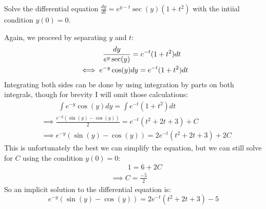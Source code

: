 \begin{example}
    Solve the differential equation $\frac{dy}{dt} = e^{y - t}\sec(y)(1 + t^2)$ with the intiial condition $y(0) = 0$. 
\end{example}
\begin{solution}
    Again, we proceed by separating $y$ and $t$:
    \begin{align*}
        &\hspace{1.2cm }\frac{dy}{e^y\sec(y)} = e^{-t}(1 + t^2)dt \\
        &\iff e^{-y}\cos(y) dy =  e^{-t}(1 + t^2)dt
    \end{align*}
    Integrating both sides can be done by using integration by parts on both integrals, though for brevity I will omit those calculations:
    \begin{align*}
        &\hspace{1cm} \int e^{-y}\cos(y) dy =  \int e^{-t}(1 + t^2)dt \\
        &\implies \frac{e^{-y}(\sin(y) - \cos(y))}{2} = e^{-t}(t^2 + 2t + 3) + C  \\
        &\implies e^{-y}(\sin(y) - \cos(y)) = 2e^{-t}(t^2 + 2t + 3) + 2C
    \end{align*}
    This is unfortunately the best we can simplify the equation, but we can still solve for $C$ using the condition $y(0) = 0$:
    \begin{align*}
        &\hspace{1cm} 1 = 6 + 2C \\
        &\implies C = \frac{-5}{2}
    \end{align*}
    So an implicit solution to the differential equation is:
    \[e^{-y}(\sin(y) - \cos(y)) = 2e^{-t}(t^2 + 2t + 3) - 5\]
\end{solution}



